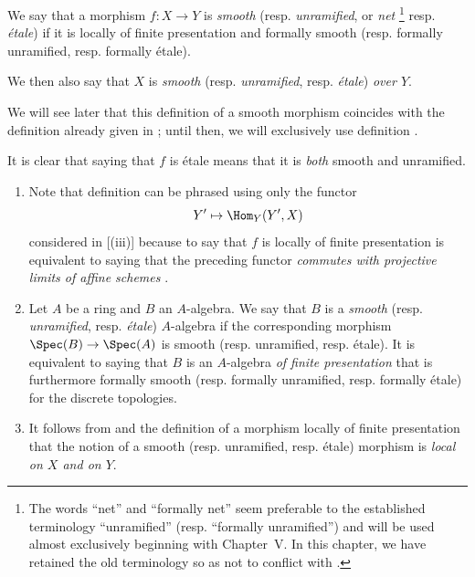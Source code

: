 \begin{definition}[17.3.1]
\label{IV.17.3.1}
We say that a morphism $f:X\to Y$ is \emph{smooth} (resp. \emph{unramified}, or \emph{net}
\footnote{The words ``net'' and ``formally net'' seem preferable to the established terminology ``unramified'' (resp. ``formally unramified'') and will be used almost exclusively beginning with Chapter~V.
In this chapter, we have retained the old terminology so as not to conflict with .}
resp. \emph{\'etale})
if it is locally of finite presentation and formally smooth (resp. formally unramified, resp. formally \'etale).
\end{definition}

We then also say that $X$ is \emph{smooth} (resp. \emph{unramified}, resp. \emph{\'etale}) \emph{over $Y$}.

We will see later  that this definition of a smooth morphism coincides with the definition already given in ;
until then, we will exclusively use definition .

It is clear that saying that $f$ is \'etale means that it is \emph{both} smooth and unramified.

\begin{remarks}[17.3.2]
\label{IV.17.3.2}
\medskip\noindent
\begin{enumerate}
  \item[(i)] Note that definition  can be phrased using only the functor
    \[
      Y'\mapsto\Hom_Y(Y',X)
    \]
    considered in [(iii)] because to say that $f$ is locally of finite presentation is equivalent to saying that the preceding functor \emph{commutes with projective limits of affine schemes} .
  \item[(ii)] Let $A$ be a ring and $B$ an $A$-algebra. 
   We say that $B$ is a \emph{smooth} (resp. \emph{unramified}, resp. \emph{\'etale}) $A$-algebra if the corresponding morphism $\Spec(B)\to\Spec(A)$ is smooth (resp. unramified, resp. \'etale).
   It is equivalent to saying that $B$ is an $A$-algebra \emph{of finite presentation}  that is furthermore formally smooth (resp. formally unramified, resp. formally \'etale) for the discrete topologies.
  \item[(iii)] It follows from  and the definition of a morphism locally of finite presentation  that the notion of a smooth (resp. unramified, resp. \'etale) morphism is \emph{local on $X$ and on $Y$}.
\end{enumerate}
\end{remarks}

